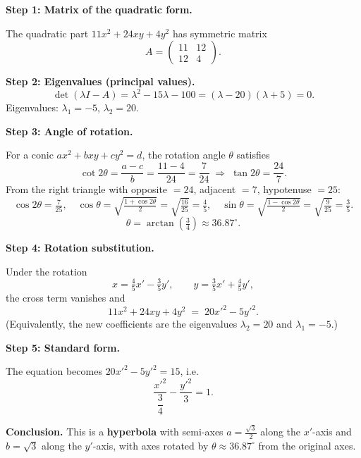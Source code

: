\documentclass[12pt,a3paper]{article}
\begin{document}
\begin{tcolorbox}[enhanced,breakable,
  colback=cE!4,colframe=cE,boxrule=0.8pt,arc=5pt,
  title={\textbf{Answer --- Conic Section: $11x^2+24xy+4y^2-15=0$}},
  fonttitle=\bfseries\color{white},colbacktitle=cE]
 
\textbf{Step 1: Matrix of the quadratic form.}
 
The quadratic part $11x^2 + 24xy + 4y^2$ has symmetric matrix
\[
  A = \begin{pmatrix}11 & 12\\12 & 4\end{pmatrix}.
\]
 
\textbf{Step 2: Eigenvalues (principal values).}
\[
  \det(\lambda I - A) = \lambda^2 - 15\lambda - 100 = (\lambda-20)(\lambda+5) = 0.
\]
Eigenvalues: $\lambda_1 = -5$,\; $\lambda_2 = 20$.
 
\textbf{Step 3: Angle of rotation.}
 
For a conic $ax^2 + bxy + cy^2 = d$, the rotation angle $\theta$ satisfies
\[
  \cot 2\theta = \frac{a-c}{b} = \frac{11-4}{24} = \frac{7}{24}
  \;\Longrightarrow\; \tan 2\theta = \frac{24}{7}.
\]
From the right triangle with opposite $= 24$, adjacent $= 7$, hypotenuse $= 25$:
\[
  \cos 2\theta = \tfrac{7}{25}, \quad
  \cos\theta = \sqrt{\tfrac{1+\cos 2\theta}{2}} = \sqrt{\tfrac{16}{25}} = \tfrac{4}{5}, \quad
  \sin\theta = \sqrt{\tfrac{1-\cos 2\theta}{2}} = \sqrt{\tfrac{9}{25}} = \tfrac{3}{5}.
\]
\[
  \boxed{\theta = \arctan\!\left(\tfrac{3}{4}\right) \approx 36.87^\circ.}
\]
 
\textbf{Step 4: Rotation substitution.}
 
Under the rotation
\[
  x = \tfrac{4}{5}x' - \tfrac{3}{5}y', \qquad y = \tfrac{3}{5}x' + \tfrac{4}{5}y',
\]
the cross term vanishes and
\[
  11x^2 + 24xy + 4y^2 \;=\; 20x'^2 - 5y'^2.
\]
(Equivalently, the new coefficients are the eigenvalues $\lambda_2 = 20$ and $\lambda_1 = -5$.)
 
\textbf{Step 5: Standard form.}
 
The equation becomes $20x'^2 - 5y'^2 = 15$, i.e.\
\[
  \boxed{\frac{x'^2}{\dfrac{3}{4}} - \frac{y'^2}{3} = 1.}
\]
 
\textbf{Conclusion.} This is a \textbf{hyperbola} with semi-axes $a = \tfrac{\sqrt{3}}{2}$
along the $x'$-axis and $b = \sqrt{3}$ along the $y'$-axis,
with axes rotated by $\theta \approx 36.87^\circ$ from the original axes.
 
\end{tcolorbox}
 
\end{document}
